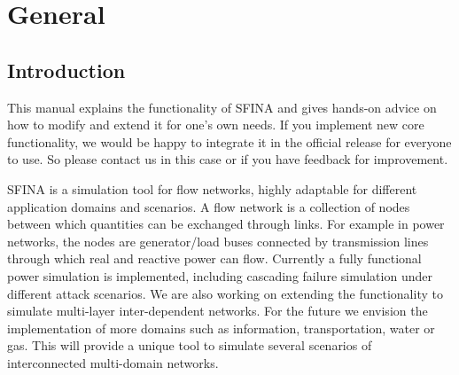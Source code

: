 \documentclass[11pt,fleqn]{book} %
\begin{document}


\pagestyle{empty} %

\tableofcontents %

\clearpage %

\pagestyle{fancy} %


\part{General}



\chapter{Introduction}
This manual explains the functionality of SFINA and gives hands-on advice on how to modify and extend it for one's own needs. If you implement new core functionality, we would be happy to integrate it in the official release for everyone to use. So please contact us in this case or if you have feedback for improvement.

SFINA is a simulation tool for flow networks, highly adaptable for different application domains and scenarios. A flow network is a collection of nodes between which quantities can be exchanged through links. For example in power networks, the nodes are generator/load buses connected by transmission lines through which real and reactive power can flow. Currently a fully functional power simulation is implemented, including cascading failure simulation under different attack scenarios. We are also working on extending the functionality to simulate multi-layer inter-dependent networks. For the future we envision the implementation of more domains such as information, transportation, water or gas. This will provide a unique tool to simulate several scenarios of interconnected multi-domain networks.
\end{document}
